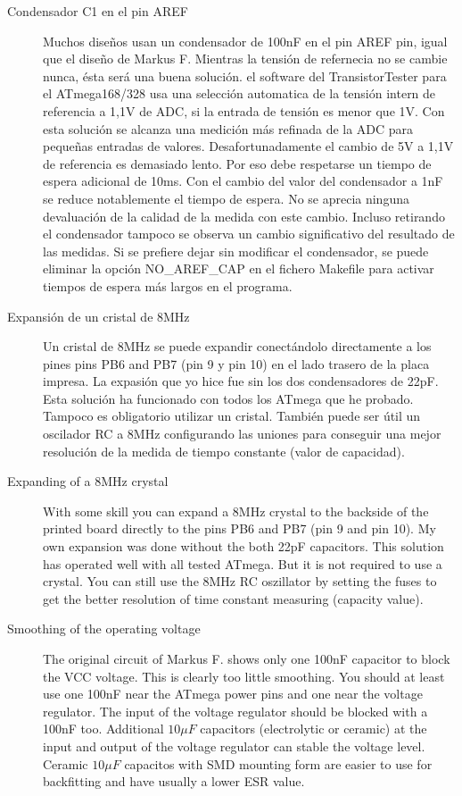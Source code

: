 \begin{description}
\item[Condensador C1 en el pin AREF]
Muchos diseños usan un condensador de 100nF en el pin AREF pin, igual que el diseño de Markus F. Mientras la tensión de refernecia no se cambie nunca, ésta será una buena solución. el software del TransistorTester para el ATmega168/328 usa una  selección automatica de la tensión intern de referencia a 1,1V de ADC, si la entrada de tensión es menor que 1V. Con esta solución se alcanza una medición más refinada de la ADC para pequeñas entradas de valores. Desafortunadamente el cambio de  5V a 1,1V de referencia es demasiado lento. Por eso debe respetarse un tiempo de espera adicional de 10ms. Con el cambio del valor del condensador a 1nF se reduce notablemente el tiempo de espera. No se aprecia ninguna devaluación de la calidad de la medida con este cambio. Incluso retirando el condensador tampoco se observa un cambio significativo  del resultado de las medidas. Si se prefiere dejar sin modificar el condensador, se puede eliminar la opción  NO\_AREF\_CAP en el fichero  Makefile para activar tiempos de espera más largos en el programa.

\item[Expansión de un cristal de 8MHz]
Un cristal de 8MHz se puede expandir conectándolo directamente a los pines pins PB6 and PB7 (pin 9 y pin 10) en el lado trasero de la placa impresa. La expasión que yo hice fue sin los dos condensadores de 22pF. Esta solución ha funcionado con todos los ATmega que he probado. Tampoco es obligatorio utilizar un cristal. También puede ser útil un oscilador RC a 8MHz configurando las uniones para conseguir una mejor resolución de la medida de tiempo constante (valor de capacidad).

\item[Expanding of a 8MHz crystal]
With some skill you can expand a 8MHz crystal to the backside of the printed board
directly to the pins PB6 and PB7 (pin 9 and pin 10).
My own expansion was done without the both 22pF capacitors.
This solution has operated well with all tested ATmega.
But it is not required to use a crystal. You can still use the 8MHz RC oszillator
by setting the fuses to get the better resolution of time constant measuring (capacity value).

\item[Smoothing of the operating voltage]
The original circuit of Markus F. shows only one 100nF capacitor to block the VCC voltage.
This is clearly too little smoothing. You should at least use one 100nF near the ATmega power pins
and one near the voltage regulator. The input of the voltage regulator should be
blocked with a 100nF too.
Additional \(10\mu F\) capacitors (electrolytic or ceramic) at the input and
output of the voltage regulator can stable the voltage level.
Ceramic \(10\mu F\) capacitos with SMD mounting form are easier to use for backfitting
and have usually a lower ESR value. 


\end{description}
